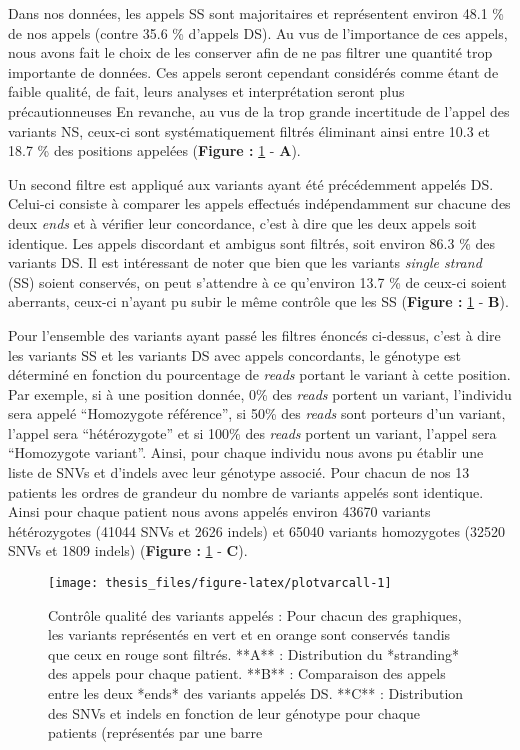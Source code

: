 \documentclass[12pt,twoside]{reedthesis}
\theoremstyle{definition}
\theoremstyle{definition}
\theoremstyle{remark}
\begin{document}
  Dans nos données, les appels SS sont majoritaires et représentent
  environ 48.1 \% de nos appels (contre 35.6 \% d'appels DS). Au vus de
  l'importance de ces appels, nous avons fait le choix de les conserver
  afin de ne pas filtrer une quantité trop importante de données. Ces
  appels seront cependant considérés comme étant de faible qualité, de
  fait, leurs analyses et interprétation seront plus précautionneuses En
  revanche, au vus de la trop grande incertitude de l'appel des variants
  NS, ceux-ci sont systématiquement filtrés éliminant ainsi entre 10.3 et
  18.7 \% des positions appelées (\textbf{Figure : }\ref{fig:plotvarcall}
  - \textbf{A}).
  
  Un second filtre est appliqué aux variants ayant été précédemment
  appelés DS. Celui-ci consiste à comparer les appels effectués
  indépendamment sur chacune des deux \emph{ends} et à vérifier leur
  concordance, c'est à dire que les deux appels soit identique. Les appels
  discordant et ambigus sont filtrés, soit environ 86.3 \% des variants
  DS. Il est intéressant de noter que bien que les variants \emph{single
  strand} (SS) soient conservés, on peut s'attendre à ce qu'environ 13.7
  \% de ceux-ci soient aberrants, ceux-ci n'ayant pu subir le même
  contrôle que les SS (\textbf{Figure : }\ref{fig:plotvarcall} -
  \textbf{B}).
  
  Pour l'ensemble des variants ayant passé les filtres énoncés ci-dessus,
  c'est à dire les variants SS et les variants DS avec appels concordants,
  le génotype est déterminé en fonction du pourcentage de \emph{reads}
  portant le variant à cette position. Par exemple, si à une position
  donnée, 0\% des \emph{reads} portent un variant, l'individu sera appelé
  ``Homozygote référence'', si 50\% des \emph{reads} sont porteurs d'un
  variant, l'appel sera ``hétérozygote'' et si 100\% des \emph{reads}
  portent un variant, l'appel sera ``Homozygote variant''. Ainsi, pour
  chaque individu nous avons pu établir une liste de SNVs et d'indels avec
  leur génotype associé. Pour chacun de nos 13 patients les ordres de
  grandeur du nombre de variants appelés sont identique. Ainsi pour chaque
  patient nous avons appelés environ 43670 variants hétérozygotes (41044
  SNVs et 2626 indels) et 65040 variants homozygotes (32520 SNVs et 1809
  indels) (\textbf{Figure : }\ref{fig:plotvarcall} - \textbf{C}).
  
  \newpage
  
  \begin{figure}
  
  {\centering \texttt{[image: thesis\_files/figure-latex/plotvarcall-1]} 
  
  }
  
  \caption[Contrôle qualité des variants appelés]{Contrôle qualité des variants appelés : Pour chacun des graphiques, les variants représentés en vert et en orange sont conservés tandis que ceux en rouge sont filtrés. **A** : Distribution du *stranding* des appels pour chaque patient. **B** : Comparaison des appels entre les deux *ends* des variants appelés DS. **C** : Distribution des SNVs et indels en fonction de leur génotype pour chaque patients (représentés par une barre}\label{fig:plotvarcall}
  \end{figure}
  
\end{document}
